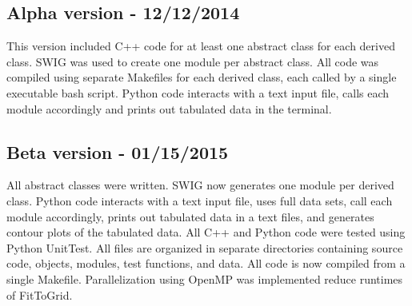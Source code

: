 \documentclass[11pt]{article}
\begin{document}
\subsection{Alpha version - 12/12/2014}
This version included C++ code for at least one abstract class for each derived class. SWIG was used to create one module per abstract class. All code was compiled using separate Makefiles for each derived class, each called by a single executable bash script. Python code interacts with a text input file, calls each module accordingly and prints out tabulated data in the terminal.

\subsection{Beta version - 01/15/2015}
All abstract classes were written. SWIG now generates one module per
derived class. Python code interacts with a text input file, uses full
data sets, call each module accordingly, prints out tabulated data in
a text files, and generates contour plots of the tabulated data. All
C++ and Python code were tested using Python UnitTest. All files are
organized in separate directories containing source code, objects,
modules, test functions, and data. All code is now compiled from a
single Makefile. Parallelization using OpenMP was implemented reduce
runtimes of FitToGrid.
\end{document}
